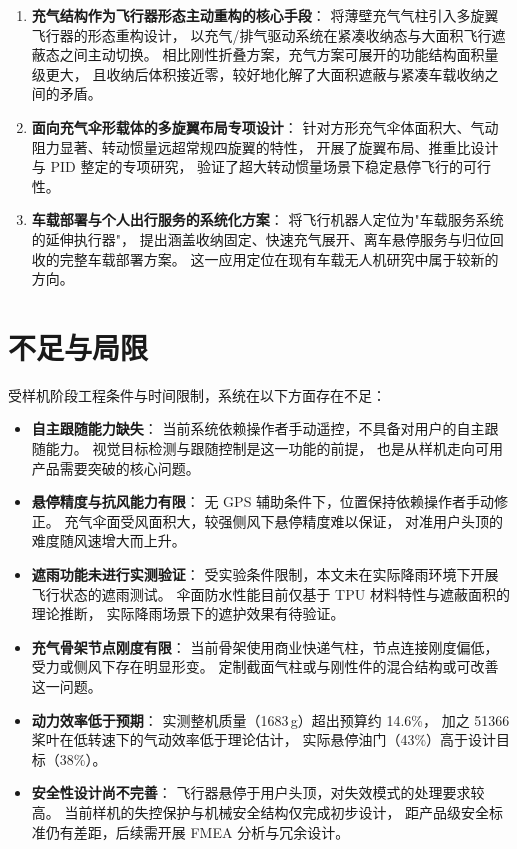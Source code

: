 \begin{enumerate}
    \item \textbf{充气结构作为飞行器形态主动重构的核心手段}：
          将薄壁充气气柱引入多旋翼飞行器的形态重构设计，
          以充气/排气驱动系统在紧凑收纳态与大面积飞行遮蔽态之间主动切换。
          相比刚性折叠方案，充气方案可展开的功能结构面积量级更大，
          且收纳后体积接近零，较好地化解了大面积遮蔽与紧凑车载收纳之间的矛盾。

    \item \textbf{面向充气伞形载体的多旋翼布局专项设计}：
          针对方形充气伞体面积大、气动阻力显著、转动惯量远超常规四旋翼的特性，
          开展了旋翼布局、推重比设计与 PID 整定的专项研究，
          验证了超大转动惯量场景下稳定悬停飞行的可行性。

    \item \textbf{车载部署与个人出行服务的系统化方案}：
          将飞行机器人定位为"车载服务系统的延伸执行器"，
          提出涵盖收纳固定、快速充气展开、离车悬停服务与归位回收的完整车载部署方案。
          这一应用定位在现有车载无人机研究中属于较新的方向。
\end{enumerate}


\section{不足与局限}

受样机阶段工程条件与时间限制，系统在以下方面存在不足：

\begin{itemize}
    \item \textbf{自主跟随能力缺失}：
          当前系统依赖操作者手动遥控，不具备对用户的自主跟随能力。
          视觉目标检测与跟随控制是这一功能的前提，
          也是从样机走向可用产品需要突破的核心问题。

    \item \textbf{悬停精度与抗风能力有限}：
          无 GPS 辅助条件下，位置保持依赖操作者手动修正。
          充气伞面受风面积大，较强侧风下悬停精度难以保证，
          对准用户头顶的难度随风速增大而上升。

    \item \textbf{遮雨功能未进行实测验证}：
          受实验条件限制，本文未在实际降雨环境下开展飞行状态的遮雨测试。
          伞面防水性能目前仅基于 TPU 材料特性与遮蔽面积的理论推断，
          实际降雨场景下的遮护效果有待验证。

    \item \textbf{充气骨架节点刚度有限}：
          当前骨架使用商业快递气柱，节点连接刚度偏低，
          受力或侧风下存在明显形变。
          定制截面气柱或与刚性件的混合结构或可改善这一问题。

    \item \textbf{动力效率低于预期}：
          实测整机质量（1683\,g）超出预算约 14.6\%，
          加之 51366 桨叶在低转速下的气动效率低于理论估计，
          实际悬停油门（43\%）高于设计目标（38\%）。

    \item \textbf{安全性设计尚不完善}：
          飞行器悬停于用户头顶，对失效模式的处理要求较高。
          当前样机的失控保护与机械安全结构仅完成初步设计，
          距产品级安全标准仍有差距，后续需开展 FMEA 分析与冗余设计。
\end{itemize}


